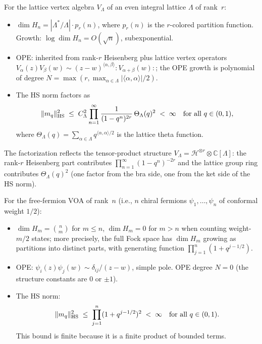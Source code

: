 \begin{computation}
For the lattice vertex algebra $V_\Lambda$ of an even integral lattice $\Lambda$ of rank~$r$:
\begin{itemize}
\item $\dim H_n = |\Lambda^*/\Lambda| \cdot p_r(n)$, where $p_r(n)$ is the $r$-colored partition function. Growth: $\log \dim H_n = O(\sqrt{n})$, subexponential.
\item OPE: inherited from rank-$r$ Heisenberg plus lattice vertex operators $V_\alpha(z)V_\beta(w) \sim (z-w)^{\langle\alpha,\beta\rangle}:\!V_{\alpha+\beta}(w)\!:$; the OPE growth is polynomial of degree $N = \max(r, \max_{\alpha \in \Lambda}|\langle\alpha,\alpha\rangle|/2)$.
\item The HS norm factors as
 \begin{equation}%
 \|m_q\|_{\HS}^2 \;\leq\; C_\Lambda^2\prod_{n=1}^\infty \frac{1}{(1-q^n)^{2r}} \,\Theta_\Lambda(q)^2 \;<\; \infty \quad\text{for all } q \in (0,1),
 \end{equation}
 where $\Theta_\Lambda(q) = \sum_{\alpha \in \Lambda} q^{\langle\alpha,\alpha\rangle/2}$ is the lattice theta function.
\end{itemize}
The factorization reflects the tensor-product structure $V_\Lambda = \mathcal{H}^{\otimes r} \otimes \mathbb{C}[\Lambda]$: the rank-$r$ Heisenberg part contributes $\prod_{n=1}^\infty (1-q^n)^{-2r}$ and the lattice group ring contributes $\Theta_\Lambda(q)^2$ (one factor from the bra side, one from the ket side of the HS norm).
\end{computation}

\begin{computation}
\label{comp:thqg-I-hs-fermion}
For the free-fermion VOA of rank~$n$ (i.e., $n$ chiral fermions $\psi_1, \ldots, \psi_n$ of conformal weight $1/2$):
\begin{itemize}
\item $\dim H_m = \binom{n}{m}$ for $m \leq n$, $\dim H_m = 0$ for $m > n$ when counting weight-$m/2$ states; more precisely, the full Fock space has $\dim H_m$ growing as partitions into distinct parts, with generating function $\prod_{j=1}^n (1 + q^{j-1/2})$.
\item OPE: $\psi_i(z)\psi_j(w) \sim \delta_{ij}/(z-w)$, simple pole. OPE degree $N = 0$ (the structure constants are $0$ or $\pm 1$).
\item The HS norm:
 \begin{equation}%
 \|m_q\|_{\HS}^2 \;\leq\; \prod_{j=1}^{n} (1 + q^{j-1/2})^2 \;<\; \infty \quad\text{for all } q \in (0,1).
 \end{equation}
 This bound is finite because it is a finite product of bounded terms.
\end{itemize}
\end{computation}

